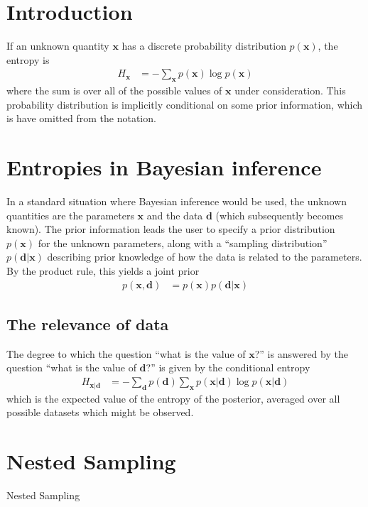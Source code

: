 \documentclass[journal,article,accept,moreauthors,pdftex,12pt,a4paper]{mdpi}
\newcommand{\x}{\boldsymbol{x}}
\renewcommand{\d}{\boldsymbol{d}}
\begin{document}

\section{Introduction}

If an unknown quantity $\x$ has a discrete probability distribution $p(\x)$,
the entropy is
\begin{align}
H_{\x} &= -\sum_{\x} p(\x) \log p(\x)
\end{align}
where the sum is over all of the possible values of $\x$ under consideration.
This probability distribution is implicitly conditional on some prior
information, which is have omitted from the notation.

\section{Entropies in Bayesian inference}

In a standard situation where Bayesian inference would be used,
the unknown quantities are the parameters $\x$ and the data $\d$
(which subsequently becomes known). The prior information leads the
user to specify a prior distribution $p(\x)$ for the unknown parameters,
along with a ``sampling distribution'' $p(\d | \x)$ describing prior knowledge
of how the data is related to the parameters. By the product rule, this yields
a joint prior
\begin{align}
p(\x, \d) &= p(\x)p(\d | \x)
\end{align}


\subsection{The relevance of data}

The degree to which the question ``what is the value of $\x$?'' is
answered by the question ``what is the value of $\d$?'' is given by the
conditional entropy
\begin{align}
H_{\x | \d} &= - \sum_{\d} p(\d) \sum_{\x} p(\x | \d) \log p(\x | \d)
\end{align}
which is the expected value of the entropy of the posterior, averaged over
all possible datasets which might be observed.


\section{Nested Sampling}
Nested Sampling \citep[NS][]{skilling2006nested}
\end{document}
